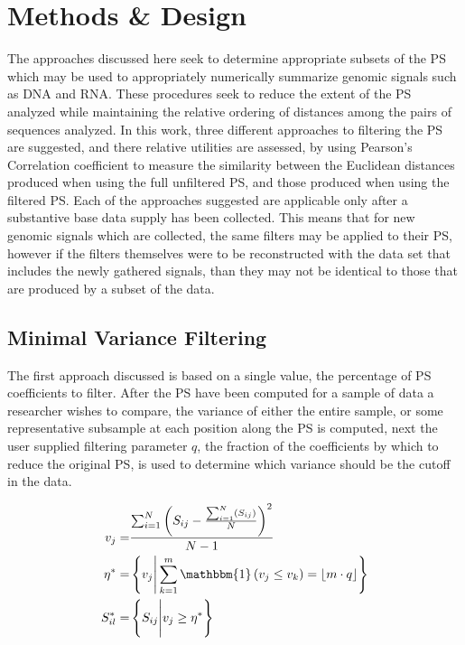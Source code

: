 \documentclass[12pt,conference]{IEEEtran}
\begin{document}
\section{Methods \& Design}
\label{sec:meth}

The approaches discussed here seek to determine appropriate subsets of the PS 
which may be used to appropriately numerically summarize genomic signals such as DNA and RNA. 
These procedures seek to reduce the extent of the PS analyzed while maintaining the
relative ordering of distances among the pairs of sequences analyzed.  
In this work, three different approaches to filtering the PS are suggested, and there relative utilities are 
assessed, by using Pearson's Correlation coefficient to measure the similarity between the Euclidean 
distances produced when using the full unfiltered PS, and those produced when using the filtered PS. 
Each of the approaches suggested are applicable only after a substantive base data supply has been 
collected. 
This means that for new genomic signals which are collected, the same filters may be applied to their 
PS, however if the filters themselves were to be reconstructed with the data set that includes the newly 
gathered signals, than they may not be identical to those that are produced by a subset of the data. 

\subsection{Minimal Variance Filtering} 

The first approach discussed is based on a single value, the percentage of PS coefficients to filter. 
After the PS have been computed for a sample of data a researcher wishes to compare, the variance of either the entire 
sample, or some representative subsample at each position along the PS is computed, next the user supplied filtering 
parameter $q$, the fraction of the coefficients by which to reduce the original PS, is used to determine which variance should be the cutoff in the data.  

\vspace{-1 em}
\begin{align} 
\label{eq:var}
\begin{split}
v_j =& \frac{\sum_{i=1}^N\left(S_{ij}-\frac{\sum_{i=1}^N(S_{ij})}{N}\right)^2 }{N-1} \\
\eta^* =& \left\{ v_j \Bigg\vert \sum_{k=1}^m \mathbbm{1}\left( v_j \leq v_k \right) = \lfloor m\cdot q\rfloor \right\}\\
S^*_{il} =& \left\{ S_{ij} \Bigg\vert v_j \geq \eta^* \right\}
\end{split}
\end{align}
\end{document}
